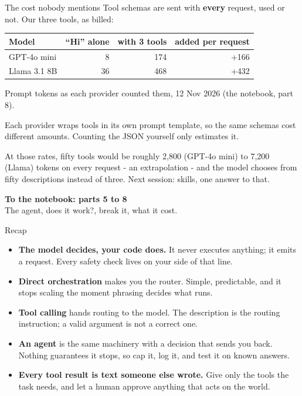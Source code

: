 \documentclass[aspectratio=169]{beamer}
\newcommand{\watchbox}[1]{%
  \begin{tcolorbox}[colback=armorange!12, colframe=armorange, boxrule=0.6pt, arc=2pt]
  #1
  \end{tcolorbox}}
\newcommand{\notebookframe}[2]{%
  \begin{frame}[plain]
    \vfill
    \begin{center}
      {\Large\bfseries\color{paramgreen} To the notebook: #1}\\[1.0em]
      {\large #2}
    \end{center}
    \vfill
  \end{frame}}
\begin{document}
\begin{frame}{The cost nobody mentions}
  \vspace{0.5em}
  Tool schemas are sent with \textbf{every} request, used or not. Our three tools, as billed:

  \vspace{0.5em}
  \begin{center}
  \small
  \begin{tabular}{lrrr}
    \toprule
    \textbf{Model} & \textbf{``Hi'' alone} & \textbf{with 3 tools} & \textbf{added per request} \\
    \midrule
    GPT-4o mini & 8 & 174 & +166 \\
    Llama 3.1 8B & 36 & 468 & +432 \\
    \bottomrule
  \end{tabular}
  \end{center}
  {\scriptsize\color{gray}Prompt tokens as each provider counted them, 12 Nov 2026 (the notebook, part 8).}

  \vspace{0.5em}
  {\small Each provider wraps tools in its own prompt template, so the same schemas cost different amounts.
  Counting the JSON yourself only estimates it.}

  \vspace{0.4em}
  \watchbox{\small At those rates, fifty tools would be roughly 2,800 (GPT-4o mini) to 7,200 (Llama)
  tokens on every request - an extrapolation - and the model chooses from fifty descriptions instead
  of three. Next session: skills, one answer to that.}
\end{frame}

\notebookframe{parts 5 to 8}{The agent, does it work?, break it, what it cost.}

\begin{frame}{Recap}
  \vspace{0.4em}
  \small
  \begin{itemize}
    \item \textbf{The model decides, your code does.} It never executes anything; it emits a
      request. Every safety check lives on your side of that line.
    \item \textbf{Direct orchestration} makes you the router. Simple, predictable, and it stops
      scaling the moment phrasing decides what runs.
    \item \textbf{Tool calling} hands routing to the model. The description is the routing
      instruction; a valid argument is not a correct one.
    \item \textbf{An agent} is the same machinery with a decision that sends you back. Nothing
      guarantees it stops, so cap it, log it, and test it on known answers.
    \item \textbf{Every tool result is text someone else wrote.} Give only the tools the task
      needs, and let a human approve anything that acts on the world.
  \end{itemize}
\end{frame}
\end{document}
